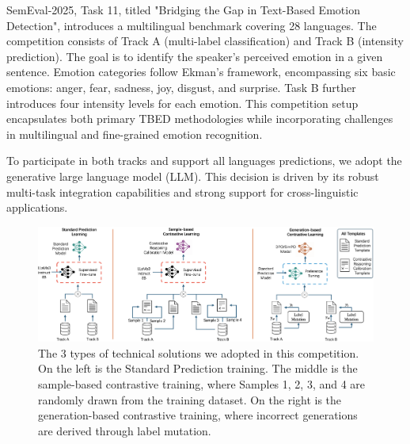 \documentclass[11pt]{article}
\begin{document}

SemEval-2025, Task 11, titled "Bridging the Gap in Text-Based Emotion Detection", introduces a multilingual benchmark covering 28 languages\cite{muhammad-etal-2025-semeval,muhammad2025brighterbridginggaphumanannotated,belay-etal-2025-evaluating}. The competition consists of Track A (multi-label classification) and Track B (intensity prediction). The goal is to identify the speaker's perceived emotion in a given sentence. Emotion categories follow Ekman's framework\cite{ekman1969repertoire}, encompassing six basic emotions: anger, fear, sadness, joy, disgust, and surprise. Task B further introduces four intensity levels for each emotion. This competition setup encapsulates both primary TBED methodologies while incorporating challenges in multilingual and fine-grained emotion recognition. 


To participate in both tracks and support all languages predictions, we adopt the generative large language model (LLM). This decision is driven by its robust multi-task integration capabilities and strong support for cross-linguistic applications.

\begin{figure}[h]
  \centering
  \includegraphics[width=430pt]{Overall}
  \vspace{-5pt}
  \caption{The 3 types of technical solutions we adopted in this competition. On the left is the Standard Prediction training. The middle is the sample-based contrastive training, where Samples 1, 2, 3, and 4 are randomly drawn from the training dataset. On the right is the generation-based contrastive training, where incorrect generations are derived through label mutation.}
  \label{fig:Overall}
 \vspace{-15pt}
\end{figure}
\end{document}
